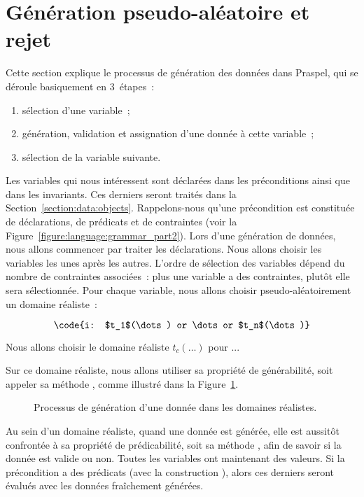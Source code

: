 \section{Génération pseudo-aléatoire et rejet}
\label{section:data:random}

Cette section explique le processus de génération des données dans Praspel, qui
se déroule basiquement en 3~étapes~:
\begin{enumerate}

\item sélection d'une variable~;

\item génération, validation et assignation d'une donnée à cette variable~;

\item sélection de la variable suivante.

\end{enumerate}

Les variables qui nous intéressent sont déclarées dans les préconditions ainsi
que dans les invariants. Ces derniers seront traités dans la
Section~\ref{section:data:objects}. Rappelons-nous qu'une précondition est
constituée de déclarations, de prédicats et de contraintes (voir la
Figure~\ref{figure:language:grammar_part2}). Lors d'une génération de données,
nous allons commencer par traiter les déclarations. Nous allons choisir les
variables les unes après les autres. L'ordre de sélection des variables dépend
du nombre de contraintes associées~: plus une variable a des contraintes, plutôt
elle sera sélectionnée. Pour chaque variable, nous allons choisir
pseudo-aléatoirement un domaine réaliste~:

$$\code{i: $t_1$(\dots) or \dots or $t_n$(\dots)}$$

Nous allons choisir le domaine réaliste $t_c(\dots)$ pour ...

Sur ce domaine réaliste, nous allons utiliser sa propriété de générabilité, soit
appeler sa méthode , comme illustré dans la
Figure~\ref{figure:data:process}.
%
\begin{figure}


\caption{\label{figure:data:process} Processus de génération d'une donnée dans
les domaines réalistes.}

\end{figure}
%
Au sein d'un domaine réaliste, quand une donnée est générée, elle est aussitôt
confrontée à sa propriété de prédicabilité, soit sa méthode ,
afin de savoir si la donnée est valide ou non. Toutes les variables ont
maintenant des valeurs.  Si la précondition a des prédicats (avec la
construction ), alors ces derniers seront évalués avec les données
fraîchement générées.

